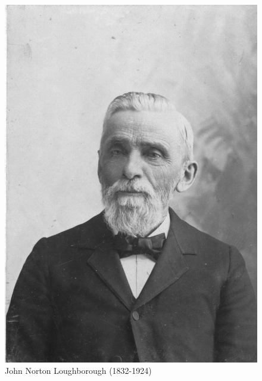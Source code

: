 \begin{figure}[hp]
    \centering
    \includegraphics[width=1\linewidth]{images/john-n-loughborough.jpg}
    \caption*{John Norton Loughborough (1832-1924)}
    \label{fig:john-n-loughborough}
\end{figure}


